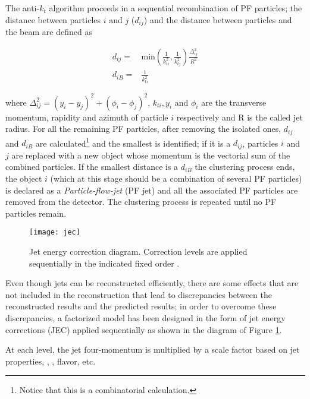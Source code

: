 The anti-$k_t$ algorithm proceeds in a sequential recombination of PF particles; the distance between particles $i$ and $j$ ($d_{ij}$)  and the distance between particles and the beam are defined as

\begin{align}\label{cov_der}
  d_{ij} = & \textrm{min}\left(\frac{1}{k_{ti}^2},\frac{1}{k_{tj}^2}\right)\frac{\Delta_{ij}^2}{R^2} \nonumber\\
  d_{iB} = & \frac{1}{k_{ti}^2}
\end{align}

\noindent where $\Delta_{ij}^2=(y_i-y_j)^2 + (\phi_i-\phi_j)^2$, $k_{ti}, y_i$ and $\phi_i$ are the transverse momentum, rapidity and azimuth of particle $i$ respectively and R is the called jet radius. For all the remaining PF particles, after removing the isolated ones, $d_{ij}$ and $d_{iB}$ are calculated\footnote{Notice that this is a combinatorial calculation.} and the smallest is identified; if it is a $d_{ij}$, particles $i$ and $j$ are replaced with a new object whose momentum is the vectorial sum of the combined particles. If the smallest distance is a $d_{iB}$ the clustering process ends, the object $i$ (which at this stage should be a combination of several PF particles) is declared as a \textit{Particle-flow-jet} (PF jet) and all the associated PF particles are removed from the detector. The clustering process is repeated until no PF particles remain.

\begin{figure}[!h]
  \centering
  \texttt{[image: jec]}
  \caption[Jet energy corrections.]{Jet energy correction diagram. Correction levels are applied sequentially in the indicated fixed order \cite{jec2}.}\label{fig:jec}
\end{figure}

Even though jets can be reconstructed efficiently, there are some effects that are not included in the reconstruction that lead to discrepancies between the reconstructed results and the predicted results; in order to overcome these discrepancies, a factorized model has been designed in the form of jet energy corrections (JEC) \cite{jec,jec2} applied  sequentially as shown in the diagram of Figure \ref{fig:jec}.

At each level, the jet four-momentum is multiplied by a scale factor based on jet properties, \ie, \etac, flavor, etc.

